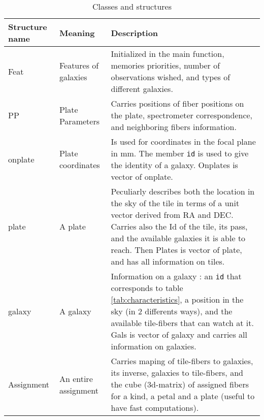 \documentclass[10pt]{extarticle}
\begin{document}
\begin{table}[H]\begin{center}
	\caption{Classes and structures}\label{tab:structures}
	\begin{tabular}{|l|l|p{12cm}|}\\ \hline
		Structure name & Meaning & Description \\ \hline \hline

		Feat & Features of galaxies & Initialized in the main function, memories priorities, number of observations wished, and types of different galaxies.\\ \hline

		PP & Plate Parameters & Carries positions of fiber positions on the plate, spectrometer correspondence, and neighboring fibers information.\\ 

		onplate & Plate coordinates & Is used for coordinates in the focal plane in mm. The member {\tt id} is used to give the identity of a galaxy. Onplates is vector of onplate.\\ 

		plate & A plate & Peculiarly describes both the location in the sky of the tile in terms of a unit vector derived from RA and DEC. Carries also the Id of the tile, its pass, and the available galaxies it is able to reach. Then Plates is vector of plate, and has all information on tiles.\\ \hline

		galaxy & A galaxy & Information on a galaxy : an {\tt id} that corresponds to table \ref{tab:characteristics}, a position in the sky (in 2 differents ways), and the available tile-fibers that can watch at it. Gals is vector of galaxy and carries all information on galaxies.\\ \hline

		Assignment & An entire assignment & Carries maping of tile-fibers to galaxies, its inverse, galaxies to tile-fibers, and the cube (3d-matrix) of assigned fibers for a kind, a petal and a plate (useful to have fast computations).\\ \hline
	\end{tabular}\end{center}
\end{table}
\end{document}
